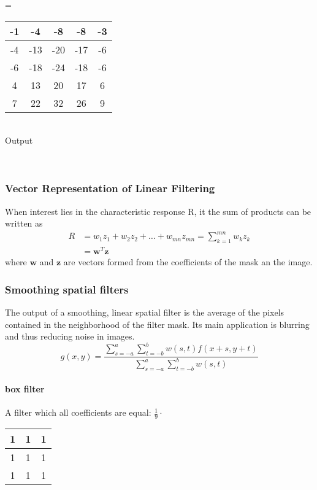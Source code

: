 	\begin{minipage}{0.3cm}
	\centering
		=
	\end{minipage}
	\begin{minipage}{2.3cm}
	\centering
		\begin{tabular}{|c|c|c|c|c|} \hline
			-1 & -4 & -8 & -8 & -3 \\\hline	
			-4 &-13 & -20 & -17 & -6 \\ \hline
	      	-6 &-18 & -24 & -18 & -6 \\ \hline
	      	4 & 13 & 20 & 17 & 6 \\ \hline
	      	7 & 22 & 32 & 26 & 9 \\ \hline
	      \end{tabular}\\
	      Output
	\end{minipage}
\\
	
\subsubsection{Vector Representation of Linear Filtering}
When interest lies in the characteristic response R, it the sum of products can be written as
\begin{align}
	R & = w_1z_1 + w_2z_2 + \dots + w_{mn}z_{mn} = \sum\limits_{k=1}^{mn}w_kz_k\\
	  & = \mathbf{w}^T\mathbf{z}
\end{align}
where $\mathbf{w}$ and $\mathbf{z}$ are vectors formed from the coefficients of the mask an the image.

\subsubsection{Smoothing spatial filters }
The output of a smoothing, linear spatial filter is the average of the pixels contained in the neighborhood of the filter mask.
Its main application is blurring and thus reducing noise in images.
\begin{equation}
g(x,y) = \frac{\sum\limits_{s=-a}^{a}\sum\limits_{t=-b}^{b}w(s,t) f(x+s, y+t)}{\sum\limits_{s=-a}^{a}\sum\limits_{t=-b}^{b}w(s,t)}
\end{equation}
\paragraph{box filter}
A filter which all coefficients are equal:
$ \frac{1}{9} \cdot$ \begin{tabular}{|c|c|c|} \hline 1 & 1 & 1 \\ \hline 1 & 1 & 1 \\ \hline 1 & 1 & 1  \\ \hline \end{tabular}
